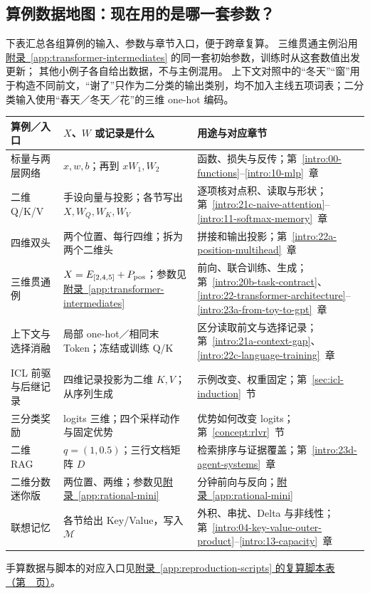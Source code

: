 \subsection{算例数据地图：现在用的是哪一套参数？}
\label{app:data-map}
下表汇总各组算例的输入、参数与章节入口，便于跨章复算。
三维贯通主例沿用\hyperref[app:transformer-intermediates]{附录~\ref*{app:transformer-intermediates}} 的同一套初始参数，训练时从这套数值出发更新；
其他小例子各自给出数据，不与主例混用。
上下文对照中的“冬天”“窗”用于构造不同前文，“谢了”只作为二分类的输出类别，均不加入主线五项词表；二分类输入使用“春天／冬天／花”的三维 one-hot 编码。

\begin{center}\small
\renewcommand{\arraystretch}{1.3}
\begin{tabularx}{\linewidth}{@{}>{\raggedright\arraybackslash}p{34mm}>{\raggedright\arraybackslash}p{45mm}>{\raggedright\arraybackslash}X@{}}
\toprule
算例／入口 & $X$、$W$ 或记录是什么 & 用途与对应章节\\\midrule
标量与两层网络 & $x,w,b$；再到 $xW_1,W_2$ & 函数、损失与反传；第~\ref*{intro:00-functions}--\ref*{intro:10-mlp}~章\\
二维 Q/K/V & 手设向量与投影；各节写出 $X,W_Q,W_K,W_V$ & 逐项核对点积、读取与形状；第~\ref*{intro:21c-naive-attention}--\ref*{intro:11-softmax-memory}~章\\
四维双头 & 两个位置、每行四维；拆为两个二维头 & 拼接和输出投影；第~\ref*{intro:22a-position-multihead}~章\\
三维贯通例 & $X=E_{[2,4,5]}+P_{\rm pos}$；参数见\hyperref[app:transformer-intermediates]{附录~\ref*{app:transformer-intermediates}} & 前向、联合训练、生成；第~\ref*{intro:20b-task-contract}、\ref*{intro:22-transformer-architecture}--\ref*{intro:23a-from-toy-to-gpt}~章\\
上下文与选择消融 & 局部 one-hot／相同末 Token；冻结或训练 Q/K & 区分读取前文与选择记录；第~\ref*{intro:21a-context-gap}、\ref*{intro:22c-language-training}~章\\
ICL 前驱与后继记录 & 四维记录投影为二维 $K,V$；从序列生成 & 示例改变、权重固定；第~\ref*{sec:icl-induction}~节\\
三分类奖励 & logits 三维；四个采样动作与固定优势 & 优势如何改变 logits；第~\ref*{concept:rlvr}~节\\
二维 RAG & $q=(1,0.5)$；三行文档矩阵 $D$ & 检索排序与证据覆盖；第~\ref*{intro:23d-agent-systems}~章\\
二维分数迷你版 & 两位置、两维；参数见\hyperref[app:rational-mini]{附录~\ref*{app:rational-mini}} & 20 分钟前向与反向；\hyperref[app:rational-mini]{附录~\ref*{app:rational-mini}}\\
联想记忆 & 各节给出 Key/Value，写入 $\mathcal M$ & 外积、串扰、Delta 与非线性；第~\ref*{intro:04-key-value-outer-product}--\ref*{intro:13-capacity}~章\\
\bottomrule
\end{tabularx}
\end{center}
手算数据与脚本的对应入口见\hyperref[app:reproduction-scripts]{附录~\ref*{app:reproduction-scripts} 的复算脚本表（第~\pageref*{app:reproduction-scripts}~页）}。
